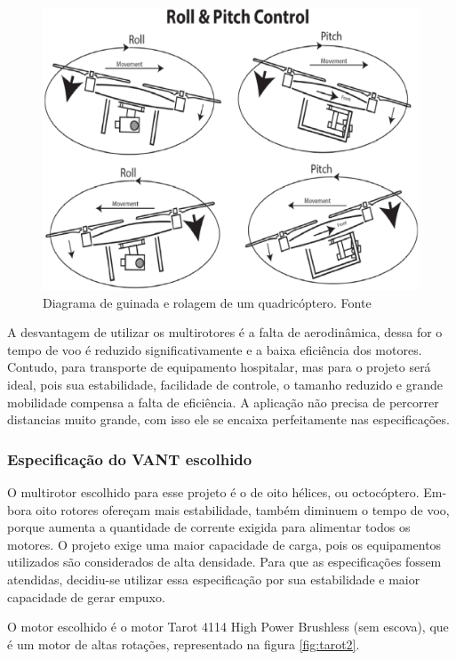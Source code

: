 \begin{figure}[H]
    \centering
      \includegraphics[keepaspectratio=true,scale=0.5]{figuras/guinada.eps}
    \caption[Diagrama de guinada e rolagem de um quadricóptero.]{Diagrama de guinada e rolagem de um quadricóptero. Fonte \cite{audronis}}
    \label{fig:guinada}
\end{figure}
A desvantagem de utilizar  os multirotores  é a  falta  de aerodinâmica,  dessa for o tempo de voo é reduzido significativamente e a baixa  eficiência dos motores.  Contudo, para transporte de equipamento hospitalar, mas para o projeto será ideal, pois sua estabilidade, facilidade de controle, o tamanho reduzido e grande mobilidade compensa a falta de eficiência. A aplicação não precisa de percorrer distancias muito grande, com isso ele se encaixa perfeitamente nas especificações.
\subsubsection{Especificação do VANT escolhido}

O multirotor escolhido para esse projeto é o de oito hélices, ou octocóptero. Em- bora oito rotores ofereçam mais estabilidade, também diminuem o tempo de voo, porque aumenta a quantidade de corrente exigida para alimentar todos os motores.  O projeto exige uma maior capacidade de carga, pois os equipamentos utilizados são considerados de alta densidade. Para que as especificações fossem atendidas, decidiu-se utilizar essa especificação por sua estabilidade e maior capacidade de gerar empuxo.

O motor escolhido é o motor Tarot 4114 High Power Brushless (sem escova), que é um motor de altas rotações, representado na figura \ref{fig:tarot2}.

